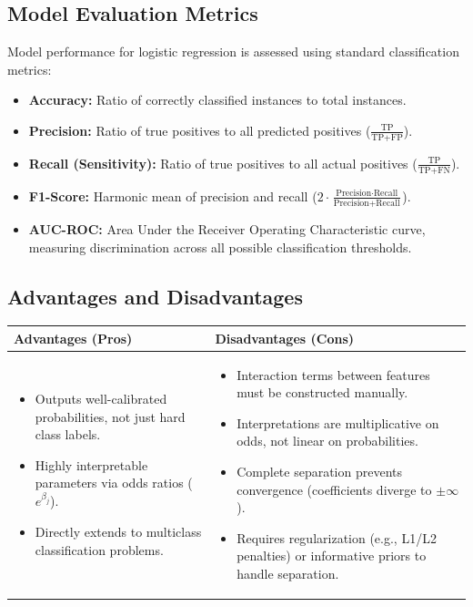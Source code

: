 \subsection{Model Evaluation Metrics}
Model performance for logistic regression is assessed using standard classification metrics:
\begin{itemize}
    \item \textbf{Accuracy:} Ratio of correctly classified instances to total instances.
    \item \textbf{Precision:} Ratio of true positives to all predicted positives ($\frac{\text{TP}}{\text{TP} + \text{FP}}$).
    \item \textbf{Recall (Sensitivity):} Ratio of true positives to all actual positives ($\frac{\text{TP}}{\text{TP} + \text{FN}}$).
    \item \textbf{F1-Score:} Harmonic mean of precision and recall ($2 \cdot \frac{\text{Precision} \cdot \text{Recall}}{\text{Precision} + \text{Recall}}$).
    \item \textbf{AUC-ROC:} Area Under the Receiver Operating Characteristic curve, measuring discrimination across all possible classification thresholds.
\end{itemize}

\subsection{Advantages and Disadvantages}

\begin{center}
\begin{tabular}{p{} p{}}
\toprule
\textbf{Advantages (Pros)} & \textbf{Disadvantages (Cons)} \\
\midrule
\begin{itemize}[leftmargin=*, nosep]
    \item Outputs well-calibrated probabilities, not just hard class labels.
    \item Highly interpretable parameters via odds ratios ($e^{\beta_j}$).
    \item Directly extends to multiclass classification problems.
\end{itemize}
&
\begin{itemize}[leftmargin=*, nosep]
    \item Interaction terms between features must be constructed manually.
    \item Interpretations are multiplicative on odds, not linear on probabilities.
    \item Complete separation prevents convergence (coefficients diverge to $\pm\infty$).
    \item Requires regularization (e.g., L1/L2 penalties) or informative priors to handle separation.
\end{itemize} \\
\bottomrule
\end{tabular}
\end{center}


